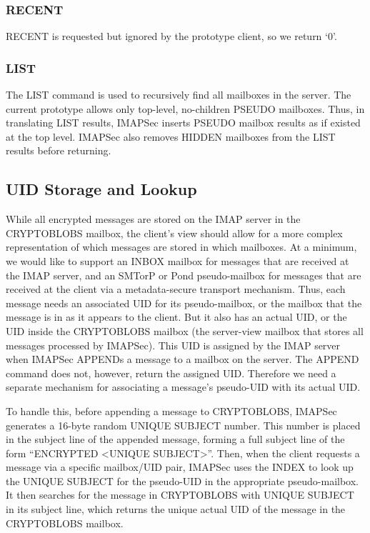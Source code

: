 \documentclass[pageno]{jpaper}
\newcommand{\project}{IMAPSec }
\newcommand{\projectnospace}{IMAPSec}
\begin{document}
\subsubsection{RECENT} RECENT is requested but ignored by the prototype client, so we return `0'.

\subsubsection{LIST} The LIST command is used to recursively find all mailboxes in the server. The current prototype allows only top-level, no-children PSEUDO mailboxes. Thus, in translating LIST results, \project inserts PSEUDO mailbox results as if existed at the top level. \project also removes HIDDEN mailboxes from the LIST results before returning.

\subsection{UID Storage and Lookup}
\label{uid-translation}

While all encrypted messages are stored on the IMAP server in the CRYPTOBLOBS mailbox, the client's view should allow for a more complex representation of which messages are stored in which mailboxes. At a minimum, we would like to support an INBOX mailbox for messages that are received at the IMAP server, and an SMTorP or Pond pseudo-mailbox for messages that are received at the client via a metadata-secure transport mechanism. Thus, each message needs an associated UID for its pseudo-mailbox, or the mailbox that the message is in as it appears to the client. But it also has an actual UID, or the UID inside the CRYPTOBLOBS mailbox (the server-view mailbox that stores all messages processed by \projectnospace). This UID is assigned by the IMAP server when \project APPENDs a message to a mailbox on the server. The APPEND command does not, however, return the assigned UID. Therefore we need a separate mechanism for associating a message's pseudo-UID with its actual UID.

To handle this, before appending a message to CRYPTOBLOBS, \project generates a 16-byte random UNIQUE SUBJECT number. This number is placed in the subject line of the appended message, forming a full subject line of the form ``ENCRYPTED <UNIQUE SUBJECT>''. Then, when the client requests a message via a specific mailbox/UID pair, \project uses the INDEX to look up the UNIQUE SUBJECT for the pseudo-UID in the appropriate pseudo-mailbox. It then searches for the message in CRYPTOBLOBS with UNIQUE SUBJECT in its subject line, which returns the unique actual UID of the message in the CRYPTOBLOBS mailbox.
\end{document}
